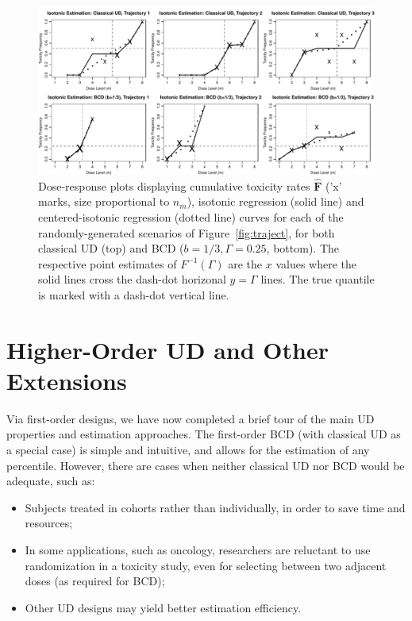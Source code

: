 \begin{figure}
\begin{center}
\includegraphics[scale=0.65]{isot}
\caption{Dose-response plots displaying cumulative toxicity rates $\mathbf{\hat{F}}$ ('x' marks, size proportional to $n_m$), isotonic regression (solid line) and centered-isotonic regression (dotted line) curves for each of the randomly-generated scenarios of Figure~\ref{fig:traject}, for both classical UD (top) and BCD ($b=1/3,\Gamma=0.25$, bottom). The respective point estimates of $F^{-1}(\Gamma)$ are the $x$ values where the solid lines cross the dash-dot horizonal $y=\Gamma$ lines. The true quantile is marked with a dash-dot vertical line.}\label{fig:isot}
\end{center}
\end{figure}





\section{Higher-Order UD and Other Extensions}\label{sec:extens}

Via first-order designs, we have now completed a brief tour of the main UD properties and estimation approaches. The first-order BCD (with classical UD as a special case) is simple and intuitive, and allows for the estimation of any percentile. However, there are cases when neither classical UD nor BCD would be adequate, such as:

\begin{itemize}
\item Subjects treated in cohorts rather than individually, in order to save time and resources;
\item In some applications, such as oncology, researchers are reluctant to use randomization in a toxicity study, even for selecting between two adjacent doses (as required for BCD);
\item Other UD designs may yield better estimation efficiency.
\end{itemize}

